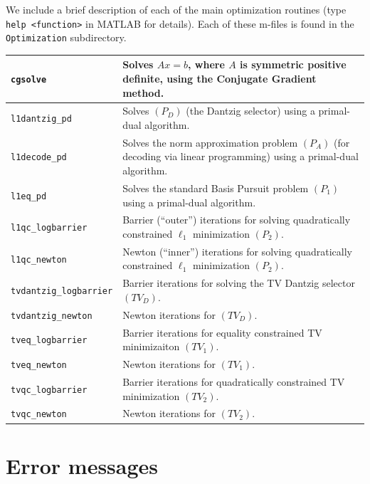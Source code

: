 \documentclass{article}
\newcommand{\<}{\langle}
\renewcommand{\>}{\rangle}
\begin{document}
We include a brief description of each of the main optimization routines (type
\texttt{help <function>} in MATLAB for details).  Each of these m-files is found in the \texttt{Optimization} subdirectory.

\begin{tabular}{|p{1.5 in}m{4 in}|} \hline
%
\texttt{cgsolve} & Solves $Ax=b$, where $A$ is symmetric positive definite, using the Conjugate Gradient method. \\[2mm]\hline
%
\texttt{l1dantzig\_pd} & Solves $(P_D)$ (the Dantzig selector) using a primal-dual algorithm. \\[2mm]\hline
%
\texttt{l1decode\_pd} & Solves the norm approximation problem $(P_A)$ (for decoding via linear programming) using a primal-dual algorithm. \\[2mm]\hline
%
\texttt{l1eq\_pd} & Solves the standard Basis Pursuit problem $(P_1)$ using a primal-dual algorithm.  \\[2mm]\hline
%
\texttt{l1qc\_logbarrier} & Barrier (``outer'') iterations for solving quadratically constrained $\ell_1$ minimization $(P_2)$. \\[2mm]\hline
%
\texttt {l1qc\_newton} & Newton (``inner'') iterations for solving quadratically constrained $\ell_1$ minimization $(P_2)$. \\[2mm]\hline
%
\texttt{tvdantzig\_logbarrier} & Barrier iterations for solving the TV Dantzig selector $(TV_D)$. \\[2mm]\hline
%
\texttt{tvdantzig\_newton} & Newton iterations for $(TV_D)$. \\[2mm]\hline
%
\texttt{tveq\_logbarrier} & Barrier iterations for equality constrained TV minimizaiton $(TV_1)$. \\[2mm]\hline
%
\texttt{tveq\_newton} & Newton iterations for $(TV_1)$. \\[2mm]\hline
%
\texttt{tvqc\_logbarrier} & Barrier iterations for quadratically constrained TV minimization $(TV_2)$. \\[2mm]\hline
%
\texttt{tvqc\_newton} & Newton iterations for $(TV_2)$. \\[2mm]\hline
%

\end{tabular}

\section{Error messages}
\end{document}
